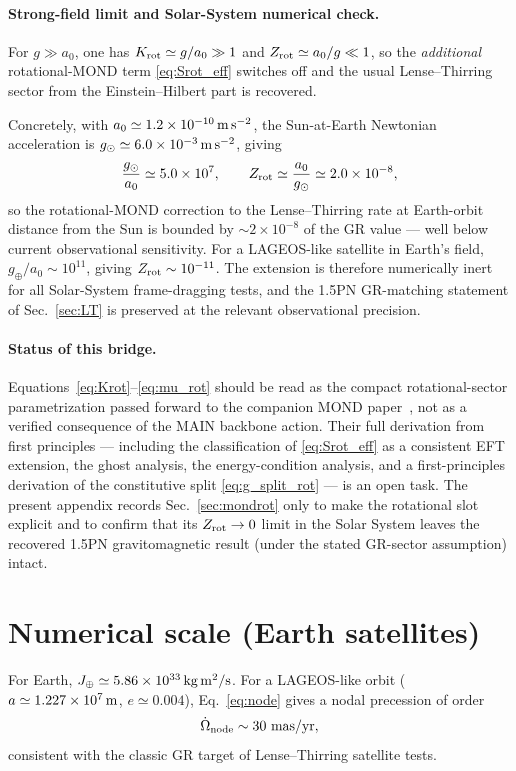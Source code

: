 \documentclass[11pt]{article}
\begin{document}
\paragraph{Strong-field limit and Solar-System numerical check.}
For $g\gg a_0$, one has $K_{\rm rot}\simeq g/a_0\gg 1$ and $Z_{\rm rot}\simeq a_0/g\ll 1$, so the \emph{additional} rotational-MOND term \eqref{eq:Srot_eff} switches off and the usual Lense--Thirring sector from the Einstein--Hilbert part is recovered.

Concretely, with $a_0\simeq 1.2\times 10^{-10}\,{\rm m\,s^{-2}}$, the Sun-at-Earth Newtonian acceleration is $g_\odot\simeq 6.0\times 10^{-3}\,{\rm m\,s^{-2}}$, giving
\begin{equation}
\frac{g_\odot}{a_0}\simeq 5.0\times 10^{7},
\qquad
Z_{\rm rot}\simeq \frac{a_0}{g_\odot}\simeq 2.0\times 10^{-8},
\end{equation}
so the rotational-MOND correction to the Lense--Thirring rate at Earth-orbit distance from the Sun is bounded by $\sim 2\times 10^{-8}$ of the GR value --- well below current observational sensitivity. For a LAGEOS-like satellite in Earth's field, $g_\oplus/a_0\sim 10^{11}$, giving $Z_{\rm rot}\sim 10^{-11}$. The extension is therefore numerically inert for all Solar-System frame-dragging tests, and the 1.5PN GR-matching statement of Sec.~\ref{sec:LT} is preserved at the relevant observational precision.

\paragraph{Status of this bridge.}
Equations~\eqref{eq:Krot}--\eqref{eq:mu_rot} should be read as the compact rotational-sector parametrization passed forward to the companion MOND paper~\cite{Lotishvili2026MOND}, not as a verified consequence of the MAIN backbone action. Their full derivation from first principles --- including the classification of \eqref{eq:Srot_eff} as a consistent EFT extension, the ghost analysis, the energy-condition analysis, and a first-principles derivation of the constitutive split \eqref{eq:g_split_rot} --- is an open task. The present appendix records Sec.~\ref{sec:mondrot} only to make the rotational slot explicit and to confirm that its $Z_{\rm rot}\to 0$ limit in the Solar System leaves the recovered 1.5PN gravitomagnetic result (under the stated GR-sector assumption) intact.

\section{Numerical scale (Earth satellites)}\label{sec:num}
For Earth, $J_\oplus\simeq 5.86\times 10^{33}\,{\rm kg\,m^2/s}$. For a LAGEOS-like orbit ($a\simeq 1.227\times 10^7\,{\rm m}$, $e\simeq 0.004$), Eq.~\eqref{eq:node} gives a nodal precession of order
\begin{equation}
\dot{\Omega}_{\rm node}\sim 30~{\rm mas/yr},
\end{equation}
consistent with the classic GR target of Lense--Thirring satellite tests.
\end{document}

